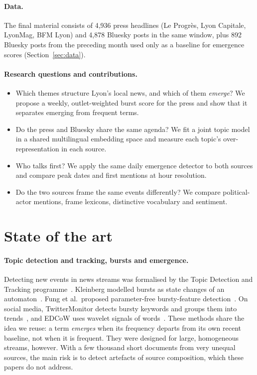 \documentclass[pdflatex,sn-mathphys-num]{sn-jnl}
\begin{document}
\paragraph{Data.} The final material consists of 4,936 press headlines (Le Progr\`es, Lyon Capitale, LyonMag, BFM Lyon) and 4,878 Bluesky posts in the same window, plus 892 Bluesky posts from the preceding month used only as a baseline for emergence scores (Section~\ref{sec:data}).

\paragraph{Research questions and contributions.}
\begin{itemize}
\item[\textbf{RQ1}] Which themes structure Lyon's local news, and which of them \emph{emerge}? We propose a weekly, outlet-weighted burst score for the press and show that it separates emerging from frequent terms.
\item[\textbf{RQ2}] Do the press and Bluesky share the same agenda? We fit a joint topic model in a shared multilingual embedding space and measure each topic's over-representation in each source.
\item[\textbf{RQ3}] Who talks first? We apply the same daily emergence detector to both sources and compare peak dates and first mentions at hour resolution.
\item[\textbf{RQ4}] Do the two sources frame the same events differently? We compare political-actor mentions, frame lexicons, distinctive vocabulary and sentiment.
\end{itemize}

\section{State of the art}\label{sec:sota}

\paragraph{Topic detection and tracking, bursts and emergence.} Detecting new events in news streams was formalised by the Topic Detection and Tracking programme~\cite{allan1998tdt}. Kleinberg modelled bursts as state changes of an automaton~\cite{kleinberg2003bursty}. Fung et al.\ proposed parameter-free bursty-feature detection~\cite{fung2005bursty}. On social media, TwitterMonitor detects bursty keywords and groups them into trends~\cite{mathioudakis2010twittermonitor}, and EDCoW uses wavelet signals of words~\cite{weng2011edcow}. These methods share the idea we reuse: a term \emph{emerges} when its frequency departs from its own recent baseline, not when it is frequent. They were designed for large, homogeneous streams, however. With a few thousand short documents from very unequal sources, the main risk is to detect artefacts of source composition, which these papers do not address.
\end{document}

